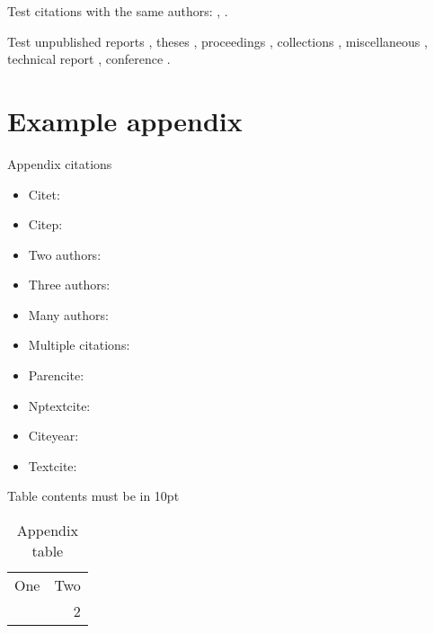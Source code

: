 \documentclass{mpi-aebr}
\begin{document}
Test citations with the same authors: \citep{ono2015marine,ono2015think,ono2015space},
\citet{ono2015marine,ono2015think,ono2015space}.

Test unpublished reports \citep{baker_census_2010},  theses \citep{carroll_rightwhale_2011},
proceedings \citep{bratten_working_1997},
collections \citep{gales_phocarctos_2008, sharp_sefra_2017},
miscellaneous \citep{delevie_hot_2014},
technical report \citep{helidoniotis_testing_2015}, conference \citep{newman_population_2008}.



\clearpage
\printbibliography

\clearpage
\newpage
\appendices
\section{Example appendix}
\label{app:the_appendix}

Appendix citations

\begin{itemize}
  \item Citet: \citet{baker_nzclassification_2010}
  \item Citep: \citep{doc_sealion_2009}
  \item Two authors: \citet{abraham_summary_98-09}
  \item Three authors: \citep{thompson_dolphin_2013}
  \item Many authors: \citep{baker_global_2007}
  \item Multiple citations: \citep{baker_global_2007, abraham_summary_98-09, gales_phocarctos_2008}
  \item Parencite: \parencite{gales_phocarctos_2008}
  \item Nptextcite: 
  \item Citeyear: \citeyear{robertson_population_2011}
  \item Textcite: \textcite{roe_necropsy_2007}
\end{itemize}

Table contents must be in 10pt

\begin{table}[h]
\caption{Appendix table}
\begin{center}
\fontsize{10}{12}\selectfont
\begin{tabular}{rr}
One & Two \\ \addlinespace
1 & 2
\end{tabular}
\end{center}
\end{table}
\end{document}
